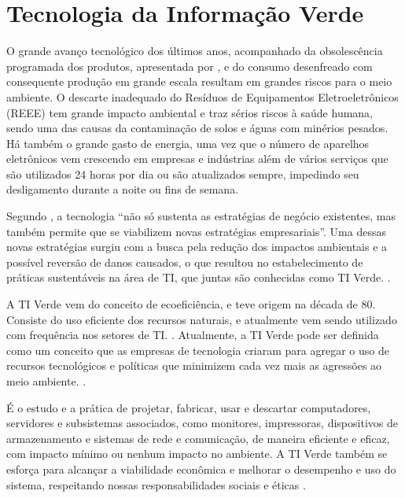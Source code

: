 \section{Tecnologia da Informação Verde}

O grande avanço tecnológico dos últimos anos, acompanhado da obsolescência programada dos produtos, apresentada por , e do consumo desenfreado com consequente produção em grande escala resultam em grandes riscos para o meio ambiente. O descarte inadequado do Resíduos de Equipamentos Eletroeletrônicos (REEE) tem grande impacto ambiental e traz sérios riscos à saúde humana, sendo uma das causas da contaminação de solos e águas com minérios pesados. Há também o grande gasto de energia, uma vez que o número de aparelhos eletrônicos vem crescendo em empresas e indústrias além de vários serviços que são utilizados 24 horas por dia ou são atualizados sempre, impedindo seu desligamento durante a noite ou fins de semana.

Segundo , a tecnologia “não só sustenta as estratégias de negócio existentes, mas também permite que se viabilizem novas estratégias empresariais”. Uma dessas novas estratégias surgiu com a busca pela redução dos impactos ambientais e a possível reversão de danos causados, o que resultou no estabelecimento de práticas sustentáveis na área de TI, que juntas são conhecidas como TI Verde. \cite{aguilar2009tecnologia}.

A TI Verde vem do conceito de ecoeficiência, e teve origem na década de 80. Consiste do uso eficiente dos recursos naturais, e atualmente vem sendo utilizado com frequência nos setores de TI. \cite{ferreira2009tiverde}. Atualmente, a TI Verde pode ser definida como um conceito que as empresas de tecnologia criaram para agregar o uso de recursos tecnológicos e políticas que minimizem cada vez mais as agressões ao meio ambiente. \cite{briefing2008preciso}.

\begin{citacao}
É o estudo e a prática de projetar, fabricar, usar e descartar computadores, servidores e subsistemas associados, como monitores, impressoras, dispositivos de armazenamento e sistemas de rede e comunicação, de maneira eficiente e eficaz, com impacto mínimo ou nenhum impacto no ambiente. A TI Verde também se esforça para alcançar a viabilidade econômica e melhorar o desempenho e uso do sistema, respeitando nossas responsabilidades sociais e éticas \cite{murugesan2008harnessing}.
\end{citacao} 

